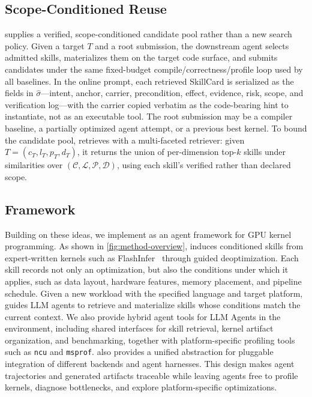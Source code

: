 \subsection{Scope-Conditioned Reuse}
\label{sec:method-use}

\sys supplies a verified, scope-conditioned candidate pool rather than a new search policy. Given a target $T$ and a root submission, the downstream agent selects admitted skills, materializes them on the target code surface, and submits candidates under the same fixed-budget compile/correctness/profile loop used by all baselines. In the online prompt, each retrieved SkillCard is serialized as the fields in $\hat{\sigma}$---intent, anchor, carrier, precondition, effect, evidence, risk, scope, and verification log---with the carrier copied verbatim as the code-bearing hint to instantiate, not as an executable tool. The root submission may be a compiler baseline, a partially optimized agent attempt, or a previous best kernel.
To bound the candidate pool, \sys retrieves with a multi-faceted retriever: given $T = (c_T, l_T, p_T, d_T)$, it returns the union of per-dimension top-$k$ skills under similarities over $(\mathcal{C}, \mathcal{L}, \mathcal{P}, \mathcal{D})$, using each skill's verified rather than declared scope.

\subsection{\sys Framework}

Building on these ideas, we implement \sys as an agent framework for GPU kernel programming. As shown in \autoref{fig:method-overview}, \sys induces conditioned skills from expert-written kernels such as FlashInfer~\cite{ye2025flashinfer} through guided deoptimization. Each skill records not only an optimization, but also the conditions under which it applies, such as data layout, hardware features, memory placement, and pipeline schedule. Given a new workload with the specified language and target platform, \sys guides LLM agents to retrieve and materialize skills whose conditions match the current context. We also provide hybrid agent tools for LLM Agents in the environment, including shared interfaces for skill retrieval, kernel artifact organization, and benchmarking, together with platform-specific profiling tools such as \texttt{ncu} and \texttt{msprof}. \sys{} also provides a unified abstraction for pluggable integration of different backends and agent harnesses. This design makes agent trajectories and generated artifacts traceable while leaving agents free to profile kernels, diagnose bottlenecks, and explore platform-specific optimizations.
